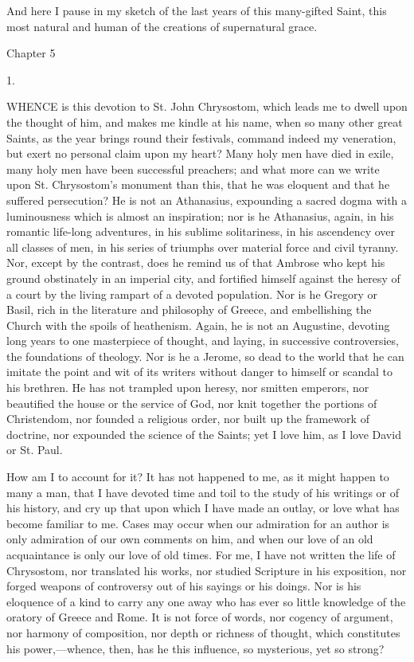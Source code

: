 And here I pause in my sketch of the last years of this many-gifted
Saint, this most natural and human of the creations of supernatural
grace.

Chapter 5


1.

WHENCE is this devotion to St. John
Chrysostom, which leads me to dwell upon the thought of him, and makes
me kindle at his name, when so many other great Saints, as the year
brings round their festivals, command indeed my veneration, but exert
no personal claim upon my heart? Many holy men have died in exile,
many holy men have been successful preachers; and what more can we
write upon St. Chrysostom's monument than this, that he was eloquent
and that he suffered persecution? He is not an Athanasius, expounding
a sacred dogma with a luminousness which is almost an inspiration; nor
is he Athanasius, again, in his romantic life-long adventures, in his
sublime solitariness, in his ascendency over all classes of men, in
his series of triumphs over material force and civil tyranny. Nor,
except by the contrast, does he remind us of that Ambrose who kept his
ground obstinately in an imperial city, and fortified himself against
the heresy of a court by the living rampart of a devoted population.
Nor is he Gregory or Basil, rich in the literature and philosophy of
Greece, and embellishing the Church with the spoils of heathenism.
Again, he is not an Augustine, devoting long years to one masterpiece
of thought, and laying, in successive controversies, the
foundations of theology. Nor is he a Jerome, so dead to the world that
he can imitate the point and wit of its writers without danger to
himself or scandal to his brethren. He has not trampled upon heresy,
nor smitten emperors, nor beautified the house or the service of God,
nor knit together the portions of Christendom, nor founded a religious
order, nor built up the framework of doctrine, nor expounded the
science of the Saints; yet I love him, as I love David or St. Paul.

How am I to account for it? It has not happened to me, as it might
happen to many a man, that I have devoted time and toil to the study
of his writings or of his history, and cry up that upon which I have
made an outlay, or love what has become familiar to me. Cases may
occur when our admiration for an author is only admiration of our own
comments on him, and when our love of an old acquaintance is only our
love of old times. For me, I have not written the life of Chrysostom,
nor translated his works, nor studied Scripture in his exposition, nor
forged weapons of controversy out of his sayings or his doings. Nor is
his eloquence of a kind to carry any one away who has ever so little
knowledge of the oratory of Greece and Rome. It is not force of words,
nor cogency of argument, nor harmony of composition, nor depth or
richness of thought, which constitutes his power,—whence, then, has
he this influence, so mysterious, yet so strong?

